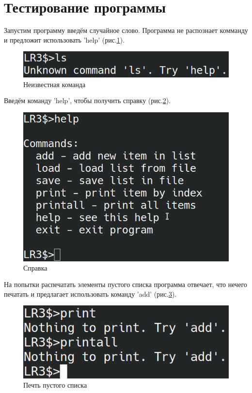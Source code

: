 \section*{Тестирование программы}

Запустим программу введём случайное слово. 
Программа не распознает комманду и предложит 
использовать 'help' (рис.\ref{test.unknown_command}). 

\begin{figure}[hpt!]
    \centering
    \includegraphics[width=0.9\linewidth]{photo/test.unknown_command}
    \caption{Неизвестная команда}
    \label{test.unknown_command}
\end{figure}

Введём команду 'help', чтобы получить справку (рис.\ref{test.help}).

\begin{figure}[hpt!]
    \centering
    \includegraphics[width=0.9\linewidth]{photo/test.help}
    \caption{Справка}
    \label{test.help}
\end{figure}

На попытки распечатать элементы пустого списка
программа отвечает, что нечего печатать и предлагает
использовать команду 'add' (рис.\ref{test.print_empty}).

\begin{figure}[H]
    \centering
    \includegraphics[width=0.9\linewidth]{photo/test.print_empty}
    \caption{Печть пустого списка}
    \label{test.print_empty}
\end{figure}

